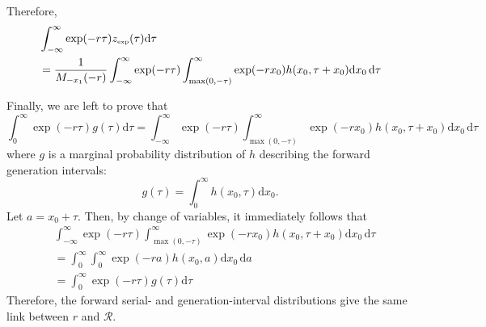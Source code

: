 \documentclass[12pt]{article}
\begin{document}
Therefore,
\begin{equation}
\begin{aligned}
&\int_{-\infty}^{\infty} \exp(-r\tau) z_{\textrm{\tiny exp}}(\tau) \mathrm{d}\tau\\
&=\frac{1}{M_{-x_1}(-r)} \int_{-\infty}^{\infty} \exp(-r\tau) \int_{\max(0, -\tau)}^\infty \exp(- r x_0) h(x_0, \tau+x_0) \mathrm{d} x_0\, \mathrm{d}\tau
\end{aligned}
\end{equation}

Finally, we are left to prove that 
\begin{equation}
\int_0^{\infty} \exp(-r\tau) g(\tau) \mathrm{d}\tau = \int_{-\infty}^{\infty} \exp(-r\tau) \int_{\max(0, -\tau)}^\infty \exp(- r x_0) h(x_0, \tau+x_0) \mathrm{d} x_0\, \mathrm{d}\tau
\end{equation}
where $g$ is a marginal probability distribution of $h$ describing the forward generation intervals:
\begin{equation}
g(\tau) = \int_0^\infty h(x_0, \tau)  \mathrm{d} x_0.
\end{equation}
Let $a = x_0 + \tau$. Then, by change of variables, it immediately follows that
\begin{equation}
\begin{aligned}
&\int_{-\infty}^{\infty} \exp(-r\tau) \int_{\max(0, -\tau)}^\infty \exp(- r x_0) h(x_0, \tau+x_0) \mathrm{d} x_0\, \mathrm{d}\tau\\
&=\int_{0}^{\infty} \int_{0}^\infty \exp(- r a) h(x_0, a) \mathrm{d} x_0\, \mathrm{d}a\\
&=\int_{0}^{\infty} \exp(-r\tau) g(\tau) \mathrm{d}\tau
\end{aligned}
\end{equation}
Therefore, the forward serial- and generation-interval distributions give the same link between $r$ and $\mathcal R$.


\end{document}
